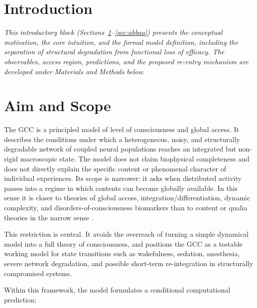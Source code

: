 \documentclass[11pt,a4paper]{article}
\theoremstyle{plain}
\theoremstyle{definition}
\theoremstyle{remark}
\begin{document}
\newpage
\tableofcontents
\newpage

\section*{Introduction}

\noindent\textit{This introductory block (Sections~\ref{sec:ziel}--\ref{sec:abbau}) presents the conceptual motivation, the core intuition, and the formal model definition, including the separation of structural degradation from functional loss of efficacy. The observables, access region, predictions, and the proposed re-entry mechanism are developed under Materials and Methods below.}

\section{Aim and Scope}
\label{sec:ziel}

The GCC is a principled model of level of consciousness and global access. It describes the conditions under which a heterogeneous, noisy, and structurally degradable network of coupled neural populations reaches an integrated but non-rigid macroscopic state. The model does not claim biophysical completeness and does not directly explain the specific content or phenomenal character of individual experiences. Its scope is narrower: it asks when distributed activity passes into a regime in which contents can become globally available. In this sense it is closer to theories of global access, integration/differentiation, dynamic complexity, and disorders-of-consciousness biomarkers than to content or qualia theories in the narrow sense \citep{dehaene1998,tononi2004,mashour2020,boly2013,casali2013,sitt2014,naccache2018,northoff2018}.

This restriction is central. It avoids the overreach of turning a simple dynamical model into a full theory of consciousness, and positions the GCC as a testable working model for state transitions such as wakefulness, sedation, anesthesia, severe network degradation, and possible short-term re-integration in structurally compromised systems.

Within this framework, the model formulates a conditional computational prediction:
\end{document}
